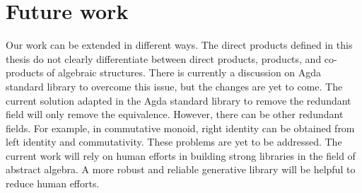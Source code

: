 \section{Future work}
\label{future}
Our work can be extended in different ways. The direct products defined in this
thesis do not clearly differentiate between direct products, products, and
co-products of algebraic structures. There is currently a discussion on Agda
standard library to overcome this issue, but the changes are yet to come. The
current solution adapted in the Agda standard library to remove the redundant
field will only remove the equivalence. However, there can be other redundant
fields. For example, in commutative monoid, right identity can be obtained from
left identity and commutativity. These problems are yet to be addressed. The
current work will rely on human efforts in building strong libraries in the
field of abstract algebra. A more robust and reliable generative library will be
helpful to reduce human efforts. 